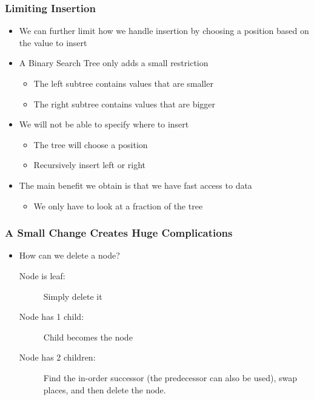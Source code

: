 \documentclass[11pt,handout]{beamer}
\begin{document}
\begin{frame}\frametitle{Limiting Insertion}
\begin{itemize}
\item We can further limit how we handle insertion by choosing a position based on the value to insert
\item A Binary Search Tree only adds a small restriction
    \begin{itemize}
    \item The left subtree contains values that are smaller
    \item The right subtree contains values that are bigger
    \end{itemize}
\item We will not be able to specify where to insert
    \begin{itemize}
    \item The tree will choose a position
    \item Recursively insert left or right
    \end{itemize}
\item The main benefit we obtain is that we have fast access to data
    \begin{itemize}
    \item We only have to look at a fraction of the tree
    \end{itemize}
\end{itemize}
\end{frame}

\begin{frame}\frametitle{A Small Change Creates Huge Complications}
\begin{itemize}
\item How can we delete a node?
\begin{description}
\item[Node is leaf:] Simply delete it
\item[Node has 1 child:] Child becomes the node
\item[Node has 2 children:] Find the in-order successor (the predecessor can also be used), swap places, and then delete the node.
\end{description}
\end{itemize}
\end{frame}
\end{document}
